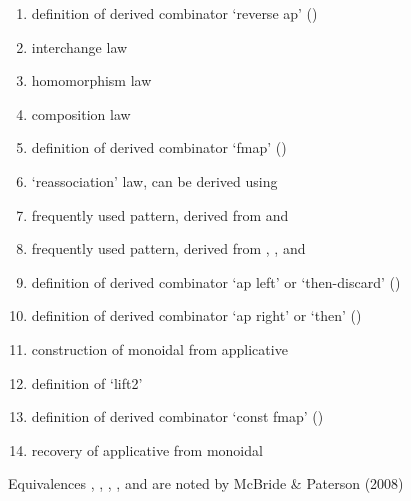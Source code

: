 \begin{enumerate}[(\sc i)]
    \itemsep0em
    \item definition of derived combinator `reverse ap' (\texttt{\pa})
    \item interchange law
    \item homomorphism law
    \item composition law
    \item definition of derived combinator `fmap' (\texttt{\fmap})
    \item `reassociation' law, can be derived using \equi[9]
    \item frequently used pattern, derived from \equi[3] and \equi[4]
    \item frequently used pattern, derived from \equi[2], \equi[3], and \equi[4]
    \item definition of derived combinator `ap left' or `then-discard' (\texttt{\apl})
    \item definition of derived combinator `ap right' or `then' (\texttt{\apr})
    \item construction of monoidal from applicative
    \item definition of `lift2'
    \item definition of derived combinator `const fmap' (\texttt{\constfmapl})
    \item recovery of applicative from monoidal
\end{enumerate}
Equivalences \equi[2], \equi[3], \equi[4], \equi[11], and \equi[14] are noted by McBride \& Paterson (2008) \cite{mcbride08}
